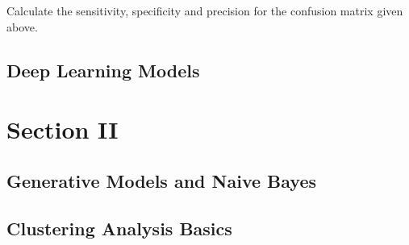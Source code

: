 \documentclass[11pt,fleqn]{book} %
\begin{document}
\begin{exercise}
Calculate the sensitivity, specificity and precision for the confusion matrix given above.
\end{exercise}



\chapter{Deep Learning Models}


\part{Section II}



\chapter{Generative Models and Naive Bayes}



\chapter{Clustering Analysis Basics}
\end{document}

